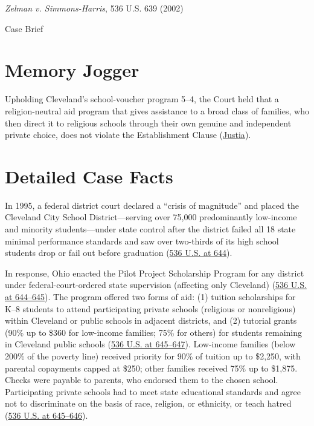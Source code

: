 \documentclass[12pt]{article}
\begin{document}
\begin{center}
{\LARGE \textit{Zelman v. Simmons-Harris}, 536 U.S. 639 (2002)\par}
\vspace{0.8em}
{\large Case Brief\par}
\end{center}
\vspace{1em}

\section{Memory Jogger}
Upholding Cleveland's school-voucher program 5--4, the Court held that a religion-neutral aid program that gives assistance to a broad class of families, who then direct it to religious schools through their own genuine and independent private choice, does not violate the Establishment Clause (\href{https://supreme.justia.com/cases/federal/us/536/639/}{Justia}).

\section{Detailed Case Facts}
In 1995, a federal district court declared a ``crisis of magnitude'' and placed the Cleveland City School District---serving over 75,000 predominantly low-income and minority students---under state control after the district failed all 18 state minimal performance standards and saw over two-thirds of its high school students drop or fail out before graduation (\href{https://supreme.justia.com/cases/federal/us/536/639/}{536 U.S. at 644}).

In response, Ohio enacted the Pilot Project Scholarship Program for any district under federal-court-ordered state supervision (affecting only Cleveland) (\href{https://supreme.justia.com/cases/federal/us/536/639/}{536 U.S. at 644--645}). The program offered two forms of aid: (1) tuition scholarships for K--8 students to attend participating private schools (religious or nonreligious) within Cleveland or public schools in adjacent districts, and (2) tutorial grants (90\% up to \$360 for low-income families; 75\% for others) for students remaining in Cleveland public schools (\href{https://supreme.justia.com/cases/federal/us/536/639/}{536 U.S. at 645--647}). Low-income families (below 200\% of the poverty line) received priority for 90\% of tuition up to \$2,250, with parental copayments capped at \$250; other families received 75\% up to \$1,875. Checks were payable to parents, who endorsed them to the chosen school. Participating private schools had to meet state educational standards and agree not to discriminate on the basis of race, religion, or ethnicity, or teach hatred (\href{https://supreme.justia.com/cases/federal/us/536/639/}{536 U.S. at 645--646}).
\end{document}
